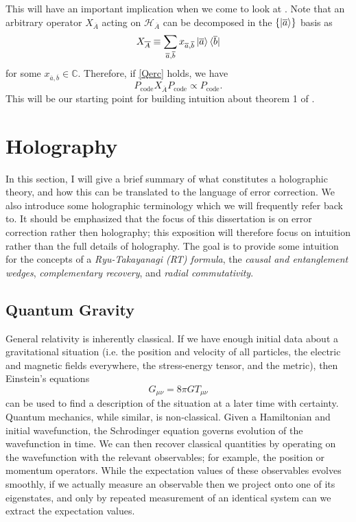 \documentclass[12pt,a4paper]{report}
\numberwithin{equation}{section}
\newcommand{\ketbra}[2]{\ket{#1}\bra{#2}}
\newcommand{\Pc}{P_{\text{code}}}
\newcommand{\ol}[1]{\overline{#1}}
\theoremstyle{definition}
\theoremstyle{theorem}
\theoremstyle{theorem}
\theoremstyle{example}
\theoremstyle{definition}
\begin{document}
This will have an important implication when we come to look at \cite{Harlow}. Note that an arbitrary operator $X_{\ol{A}}$ acting on $\mathcal{H}_{\ol{A}}$ can be decomposed in the $\{\ket{\ol{a}}\}$ basis as
\begin{equation}
	X_{\ol{A}}\equiv \sum_{\ol{a},\ol{b}}x_{\ol{a},\ol{b}}\ketbra{\ol{a}}{\ol{b}}
\end{equation}
for some $x_{\ol{a},\ol{b}}\in\mathbb{C}$. Therefore, if \ref{Qerc} holds, we have
\begin{equation}\label{EC}
	\Pc X_{\ol{A}}\Pc\propto\Pc.
\end{equation}
This will be our starting point for building intuition about theorem 1 of \cite{Harlow}.

\section{Holography}
In this section, I will give a brief summary of what constitutes a holographic theory, and how this can be translated to the language of error correction. We also introduce some holographic terminology which we will frequently refer back to. It should be emphasized that the focus of this dissertation is on error correction rather then holography; this exposition will therefore focus on intuition rather than the full details of holography. The goal is to provide some intuition for the concepts of a \textit{Ryu-Takayanagi (RT) formula}, the \textit{causal and entanglement wedges}, \textit{complementary recovery}, and \textit{radial commutativity}.
\subsection{Quantum Gravity}
General relativity is inherently classical. If we have enough initial data about a gravitational situation (i.e. the position and velocity of all particles, the electric and magnetic fields everywhere, the stress-energy tensor, and the metric), then Einstein's equations
\begin{equation}
	G_{\mu\nu}=8\pi G T_{\mu\nu}
\end{equation}
can be used to find a description of the situation at a later time with certainty.\\
Quantum mechanics, while similar, is non-classical. Given a Hamiltonian and initial wavefunction, the Schrodinger equation governs evolution of the wavefunction in time. We can then recover classical quantities by operating on the wavefunction with the relevant observables; for example, the position or momentum operators. While the expectation values of these observables evolves smoothly, if we actually measure an observable then we project onto one of its eigenstates, and only by repeated measurement of an identical system can we extract the expectation values.
\end{document}
